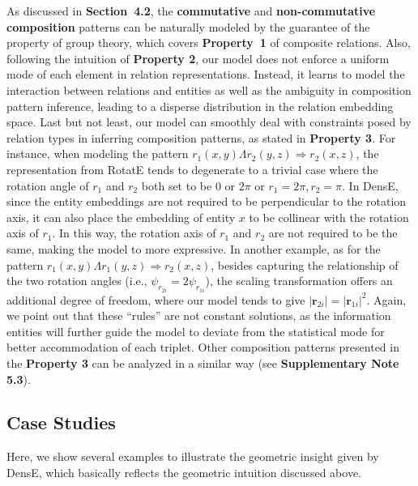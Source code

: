 \documentclass[11pt]{article}
\begin{document}
As discussed in \textbf{Section~4.2}, the \textbf{commutative} and \textbf{non-commutative composition} patterns can be naturally modeled by the guarantee of the property of group theory, which covers \textbf{Property~1} of composite relations. Also, following the intuition of \textbf{Property 2}, our model does not enforce a uniform mode of each element in relation representations. Instead, it learns to model the interaction between relations and entities as well as the ambiguity in composition pattern inference, leading to a disperse distribution in the relation embedding space. Last but not least, our model can smoothly deal with constraints posed by relation types in inferring composition patterns, as stated in \textbf{Property 3}. For instance, when modeling the pattern \(r_1(x, y) \Lambda  r_2(y, z) \Rightarrow r_2(x, z) \), the representation from RotatE tends to degenerate to a trivial case where the rotation angle of \(r_1\) and \(r_2\) both set to be \(0 \text{ or } 2\pi \text{ or } r_1=2\pi, r_2=\pi \). In DensE, since the entity embeddings are not required to be perpendicular to the rotation axis, it can also place the embedding of entity \(x\) to be collinear with the rotation axis of \(r_1\). In this way, the rotation axis of \(r_1\) and \(r_2\) are not required to be the same, making the model to more expressive.  In another example, as for the pattern \(r_1(x, y) \Lambda  r_1(y, z) \Rightarrow r_2(x, z) \), besides capturing the relationship of the two rotation angles (i.e., \(\psi_{r_{2i}} = 2\psi_{r_{1i}}\)), the scaling transformation offers an additional degree of freedom, where our model tends to give \(|\textbf{r}_{2i}|=|\textbf{r}_{1i}|^2\). Again, we point out that these ``rules'' are not constant solutions, as the information entities will further guide the model to deviate from the statistical mode for better accommodation of each triplet. Other composition patterns presented in the \textbf{Property 3} can be analyzed in a similar way (see \textbf{Supplementary Note 5.3}).

\subsection{Case Studies}
Here, we show several examples to illustrate the geometric insight given by DensE, which basically reflects the geometric intuition discussed above. 
\end{document}
